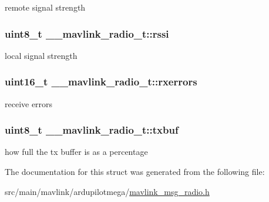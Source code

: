 remote signal strength 

\hypertarget{struct____mavlink__radio__t_a037fac1d570dc799e3f7b9d60103357f}{
\subsubsection[{rssi}]{\setlength{\rightskip}{0pt plus 5cm}uint8\+\_\+t \+\_\+\+\_\+mavlink\+\_\+radio\+\_\+t\+::rssi}}\label{struct____mavlink__radio__t_a037fac1d570dc799e3f7b9d60103357f}


local signal strength 

\hypertarget{struct____mavlink__radio__t_a458075d5fd12d04d7629af705a87ce9d}{
\subsubsection[{rxerrors}]{\setlength{\rightskip}{0pt plus 5cm}uint16\+\_\+t \+\_\+\+\_\+mavlink\+\_\+radio\+\_\+t\+::rxerrors}}\label{struct____mavlink__radio__t_a458075d5fd12d04d7629af705a87ce9d}


receive errors 

\hypertarget{struct____mavlink__radio__t_a303caa23fe92a54cf62eedcc85bd3580}{
\subsubsection[{txbuf}]{\setlength{\rightskip}{0pt plus 5cm}uint8\+\_\+t \+\_\+\+\_\+mavlink\+\_\+radio\+\_\+t\+::txbuf}}\label{struct____mavlink__radio__t_a303caa23fe92a54cf62eedcc85bd3580}


how full the tx buffer is as a percentage 



The documentation for this struct was generated from the following file\+:\begin{DoxyCompactItemize}
\item 
src/main/mavlink/ardupilotmega/\hyperlink{mavlink__msg__radio_8h}{mavlink\+\_\+msg\+\_\+radio.\+h}\end{DoxyCompactItemize}
